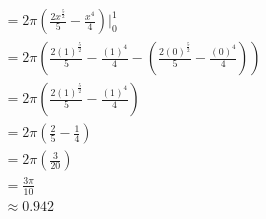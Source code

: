 \documentclass[letterpaper, 12pt]{article}
\begin{document}
\begin{align}
                                                                    & =2\pi\left(\frac{2x^{\frac{5}{2}}}{5}-\frac{x^{4}}{4}\right)\Big|_{0}^{1}                                                                                                \\
                                                                    & =2\pi\left(\frac{2\left(1\right)^{\frac{5}{2}}}{5}-\frac{\left(1\right)^{4}}{4}-\left(\frac{2\left(0\right)^{\frac{5}{2}}}{5}-\frac{\left(0\right)^{4}}{4}\right)\right) \\
                                                                    & =2\pi\left(\frac{2\left(1\right)^{\frac{5}{2}}}{5}-\frac{\left(1\right)^{4}}{4}\right)                                                                                   \\
                                                                    & =2\pi\left(\frac{2}{5}-\frac{1}{4}\right)                                                                                                                                \\
                                                                    & =2\pi\left(\frac{3}{20}\right)                                                                                                                                           \\
                                                                    & =\frac{3\pi}{10}                                                                                                                                                         \\
                                                                    & \approx\boxed{0.942}
\end{align}
\end{document}
